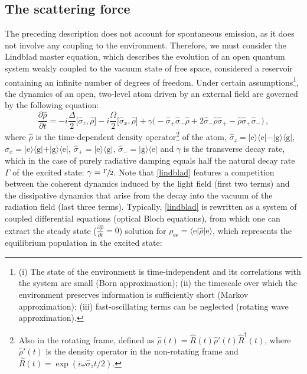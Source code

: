 \documentclass[../Thesis-IJspeert.tex]{subfiles}
\begin{document}
\subsection{The scattering force}
The preceding description does not account for spontaneous emission, as it does not involve any coupling to the environment. Therefore, we must consider the Lindblad master equation, which describes the evolution of an open quantum system weakly coupled to the vacuum state of free space, considered a reservoir containing an infinite number of degrees of freedom. Under certain assumptions\footnote{(i) The state of the environment is time-independent and its correlations with the system are small (Born approximation); (ii) the timescale over which the environment preserves information is sufficiently short (Markov approximation); (iii) fast-oscillating terms can be neglected (rotating wave approximation).}, the dynamics of an open, two-level atom driven by an external field are governed by the following equation:
\begin{equation}
\label{lindblad}
\frac{\partial\hat{\rho}}{\partial t}=-i\frac{\Delta}{2}\big[\hat{\sigma}_z,\hat{\rho}\big]-i\frac{\Omega}{2}\big[\hat{\sigma}_x,\hat{\rho}\big] + \gamma \big(-\hat{\sigma}_+\hat{\sigma}_-\hat{\rho}+2\hat{\sigma}_-\hat{\rho}\hat{\sigma}_+-\hat{\rho}\hat{\sigma}_+\hat{\sigma}_-\big)\,,
\end{equation}
where $\hat{\rho}$ is the time-dependent density operator\footnote{Also in the rotating frame, defined as $\hat{\rho}(t)=\hat{R}(t)\hat{\rho}'(t)\hat{R}^\dagger(t)$, where $\hat{\rho}'(t)$ is the density operator in the non-rotating frame and $\hat{R}(t)=\exp(i\omega\hat{\sigma}_z t/2)$.} of the atom,
 $\hat{\sigma}_z=\vert \mathrm{e} \rangle \langle \mathrm{e} \vert-\vert \mathrm{g} \rangle \langle \mathrm{g} \vert$, $\hat{\sigma}_x=\vert \mathrm{e} \rangle \langle \mathrm{g} \vert+\vert \mathrm{g} \rangle \langle \mathrm{e} \vert$, $\hat{\sigma}_+=\vert \mathrm{e} \rangle \langle \mathrm{g} \vert$, $\hat{\sigma}_-=\vert \mathrm{g} \rangle \langle \mathrm{e} \vert$ and $\gamma$ is the transverse decay rate, which in the case of purely radiative damping equals half the natural decay rate $\Gamma$ of the excited state: $\gamma=\sfrac{\Gamma}{2}$. Note that \autoref{lindblad} features a competition between the coherent dynamics induced by the light field (first two terms) and the dissipative dynamics that arise from the decay into the vacuum of the radiation field (last three terms). Typically, \autoref{lindblad} is rewritten as a system of coupled differential equations (optical Bloch equations), from which one can extract the steady state ($\frac{\partial\hat{\rho}}{\partial t}=0$) solution for ${\rho}_\mathrm{ee}=\langle \mathrm{e} \vert \hat{\rho} \vert \mathrm{e}\rangle$, which represents the equilibrium population in the excited state:
\end{document}
